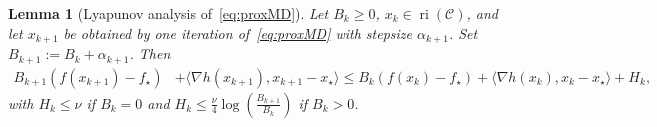 \documentclass[a4paper]{article}
\renewcommand{\leq}{\leqslant}
\renewcommand{\geq}{\geqslant}
\newcommand{\CC}{\mathcal{C}}
\newcommand{\coloneqq}{:=}
\newcommand{\ip}[2]{\langle #1, #2\rangle}
\DeclareMathOperator{\ri}{ri}
\newtheorem{lemma}{Lemma}
\begin{document}
\begin{lemma}[Lyapunov analysis of~\eqref{eq:proxMD}]\label{lem:lyapunov_proxMD}
  Let \(B_k\geq 0\), \(x_k\in \ri(\CC)\), and let \(x_{k+1}\) be obtained by one iteration of~\eqref{eq:proxMD} with stepsize \(\alpha_{k+1}\). Set \(B_{k+1}\coloneqq B_k+\alpha_{k+1}\). Then
          \begin{equation}
        \begin{aligned}\label{eq:lyap_analysis}
                B_{k+1} \left(f(x_{k+1})-f_\star\right)& + \ip{\nabla h(x_{k+1})}{ x_{k+1}-x_\star} \leq  B_k\left(f(x_{k})-f_\star\right) + \ip{\nabla h(x_{k})}{ x_{k}-x_\star}+H_k,
        \end{aligned}
        \end{equation}
        with $H_k\leq \nu$ if $B_k=0$ and $H_k\leq \frac{\nu}{4}\log\left(\frac{B_{k+1}}{B_k}\right)$ if $B_k>0$.
\end{lemma}
\end{document}
